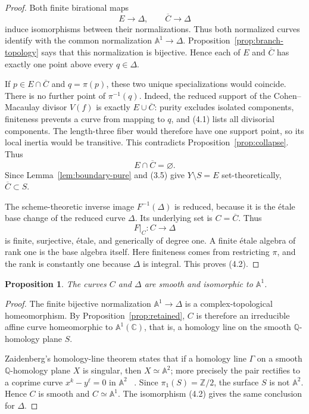 \documentclass[11pt]{article}
\newtheorem{proposition}[theorem]{Proposition}
\theoremstyle{definition}
\theoremstyle{remark}
\newcommand{\A}{\mathbb A}
\newcommand{\C}{\mathbb C}
\newcommand{\Q}{\mathbb Q}
\newcommand{\Z}{\mathbb Z}
\begin{document}
\begin{proof}
Both finite birational maps
\[
 E\longrightarrow\Delta,\qquad
 \overline C\longrightarrow\Delta
\]
induce isomorphisms between their normalizations.  Thus both
normalized curves identify with the common normalization
\(\A^1\to\Delta\).
Proposition~\ref{prop:branch-topology} says that this normalization is
bijective.  Hence each of \(E\) and \(\overline C\) has exactly one
point above every \(q\in\Delta\).

If \(p\in E\cap\overline C\) and \(q=\pi(p)\), these two unique
specializations would coincide.  There is no further point of
\(\pi^{-1}(q)\).  Indeed, the reduced support of the
Cohen--Macaulay divisor \(V(f)\) is exactly
\(E\cup\overline C\): purity excludes isolated components, finiteness
prevents a curve from mapping to \(q\), and (4.1) lists all divisorial
components.  The
length-three fiber would therefore have one support point, so its local
inertia would be transitive.  This contradicts
Proposition~\ref{prop:collapse}.  Thus
\[
 E\cap\overline C=\varnothing.
\]
Since Lemma~\ref{lem:boundary-pure} and (3.5) give
\(Y\setminus S=E\) set-theoretically, \(\overline C\subset S\).

The scheme-theoretic inverse image \(F^{-1}(\Delta)\) is reduced,
because it is the \'etale base change of the reduced curve \(\Delta\).
Its underlying set is \(C=\overline C\).  Thus
\[
 F|_C:C\longrightarrow\Delta
\]
is finite, surjective, \'etale, and generically of degree one.  A
finite \'etale algebra of rank one is the base algebra itself.  Here
finiteness comes from restricting \(\pi\), and the rank is constantly
one because \(\Delta\) is integral.  This proves (4.2).
\end{proof}

\begin{proposition}\label{prop:smooth-line}
The curves \(C\) and \(\Delta\) are smooth and isomorphic to \(\A^1\).
\end{proposition}

\begin{proof}
The finite bijective normalization
\(\A^1\to\Delta\) is a complex-topological homeomorphism.  By
Proposition~\ref{prop:retained}, \(C\) is therefore an irreducible
affine curve homeomorphic to \(\A^1(\C)\), that is, a homology line on
the smooth \(\Q\)-homology plane \(S\).

Zaidenberg's homology-line theorem states that if a homology line
\(\Gamma\) on a smooth \(\Q\)-homology plane \(X\) is singular, then
\(X\simeq\A^2\); more precisely the pair rectifies to a coprime
curve \(x^k-y^\ell=0\) in \(\A^2\)
~\cite[Theorem 1(c)]{Zaidenberg}.  Since
\(\pi_1(S)=\Z/2\), the surface \(S\) is not \(\A^2\).  Hence \(C\) is
smooth and \(C\simeq\A^1\).  The isomorphism (4.2) gives the same
conclusion for \(\Delta\).
\end{proof}
\end{document}
